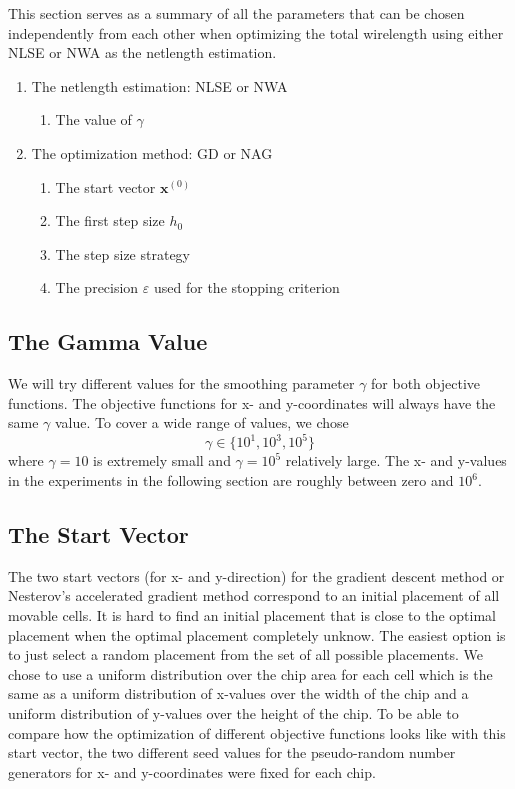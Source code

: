 This section serves as a summary of all the parameters that can be chosen independently from each other
when optimizing the total wirelength using either NLSE or NWA as the netlength estimation.
\begin{enumerate}
 \item The netlength estimation: NLSE or NWA
 \begin{enumerate}
  \item The value of \(\gamma\)
 \end{enumerate}
 \item The optimization method: GD or NAG
 \begin{enumerate}
  \item The start vector \(\mathbf{x}^{(0)}\)
  \item The first step size \(h_0\)
  \item The step size strategy
  \item The precision \(\varepsilon\) used for the stopping criterion
 \end{enumerate}
\end{enumerate}


\subsection{The Gamma Value} \label{subsec:implementation_gamma}

We will try different values for the smoothing parameter \(\gamma\) for both objective functions.
The objective functions for x- and y-coordinates will always have the same \(\gamma\) value.
To cover a wide range of values, we chose 
\[ \gamma \in \{ 10^1, 10^3, 10^5 \} \]
where \(\gamma = 10\) is extremely small and \(\gamma = 10^5\) relatively large.
The x- and y-values in the experiments in the following section are roughly between zero and \(10^6\).


\subsection{The Start Vector} \label{subsec:implementation_start_vector}

The two start vectors (for x- and y-direction) for the gradient descent method or Nesterov's accelerated gradient method
correspond to an initial placement of all movable cells.
It is hard to find an initial placement that is close to the optimal placement
when the optimal placement completely unknow.
The easiest option is to just select a random placement from the set of all possible placements.
We chose to use a uniform distribution over the chip area for each cell
which is the same as a uniform distribution of x-values over the width of the chip
and a uniform distribution of y-values over the height of the chip.
To be able to compare how the optimization of different objective functions looks like with this start vector,
the two different seed values for the pseudo-random number generators
for x- and y-coordinates were fixed for each chip.

